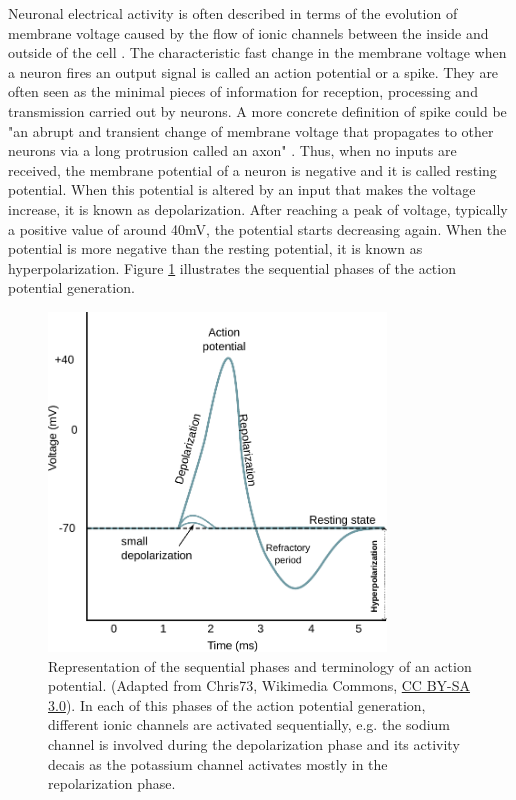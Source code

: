 Neuronal electrical activity is often described in terms of the evolution of membrane voltage caused by the flow of ionic channels between the inside and outside of the cell \parencite{kandel_principles_2012}. The characteristic fast change in the membrane voltage when a neuron fires an output signal is called an action potential or a spike. They are often seen as the minimal pieces of information for reception, processing and transmission carried out by neurons. A more concrete definition of spike could be "an abrupt and transient change of membrane voltage that propagates to other neurons via a long protrusion called an axon" \parencite{izhikevich_dynamical_2007}. Thus, when no inputs are received, the membrane potential of a neuron is negative and it is called resting potential. When this potential is altered by an input that makes the voltage increase, it is known as depolarization. After reaching a peak of voltage, typically a positive value of around 40mV, the potential starts decreasing again. When the potential is more negative than the resting potential, it is known as hyperpolarization. Figure \ref{fig:action potential} illustrates the sequential phases of the action potential generation. 

\begin{figure}[htb!]
    \centering
    \includegraphics[width=0.8\textwidth]{img/intro/action_potential.pdf}
    \caption{Representation of the sequential  phases and terminology of an action potential. (Adapted from Chris73, Wikimedia Commons, \href{https://creativecommons.org/licenses/by-sa/3.0/}{CC BY-SA 3.0}). In each of this phases of the action potential generation, different ionic channels are activated sequentially, e.g. the sodium channel is involved during the depolarization phase and its activity decais as the potassium channel activates mostly in the repolarization phase. }
    \label{fig:action potential}
\end{figure}

